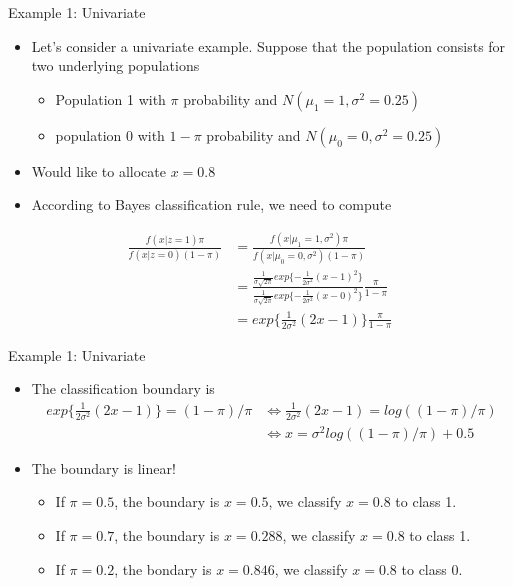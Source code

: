 \documentclass[
  ignorenonframetext,
]{beamer}
\providecommand{\tightlist}{%
  \setlength{\itemsep}{0pt}\setlength{\parskip}{0pt}}
\begin{document}
\begin{frame}{Example 1: Univariate}
\begin{itemize}
\tightlist
\item
  Let's consider a univariate example. Suppose that the population
  consists for two underlying populations

  \begin{itemize}
  \tightlist
  \item
    Population 1 with \(\pi\) probability and
    \(N(\mu_1=1, \sigma^2=0.25)\)
  \item
    population 0 with \(1-\pi\) probability and
    \(N(\mu_0=0, \sigma^2=0.25)\)
  \end{itemize}
\item
  Would like to allocate \(x=0.8\)
\item
  According to Bayes classification rule, we need to compute
\end{itemize}

\[\begin{aligned}
\frac{f(x|z=1)\pi}{f(x|z=0)(1-\pi)} &=\frac{f(x|\mu_1=1,\sigma^2)\pi}{f(x|\mu_0=0, \sigma^2)(1-\pi)}\\
&=\frac{\frac{1}{\sigma\sqrt{2\pi}}exp\{-\frac{1}{2\sigma^2}(x-1)^2\}}
{\frac{1}{\sigma\sqrt{2\pi}}exp\{-\frac{1}{2\sigma^2}(x-0)^2\}}\frac{\pi}{1-\pi}\\
&= exp\{\frac{1}{2\sigma^2} (2x-1) \}\frac{\pi}{1-\pi}
\end{aligned}\]
\end{frame}

\begin{frame}{Example 1: Univariate}
\protect\hypertarget{example-1-univariate-1}{}
\begin{itemize}
\item
  The classification boundary is \[\begin{aligned}
  exp\{\frac{1}{2\sigma^2} (2x-1) \} =(1-\pi)/\pi &\Leftrightarrow \frac{1}{2\sigma^2} (2x-1)=log((1-\pi)/\pi)\\
  &\Leftrightarrow x=\sigma^2 log((1-\pi)/\pi)+0.5
  \end{aligned}\]
\item
  The boundary is linear!

  \begin{itemize}
  \tightlist
  \item
    If \(\pi=0.5\), the boundary is \(x=0.5\), we classify \(x=0.8\) to
    class 1.
  \item
    If \(\pi=0.7\), the boundary is \(x=0.288\), we classify \(x=0.8\)
    to class 1.
  \item
    If \(\pi=0.2\), the bondary is \(x=0.846\), we classify \(x=0.8\) to
    class 0.
  \end{itemize}
\end{itemize}
\end{frame}
\end{document}
